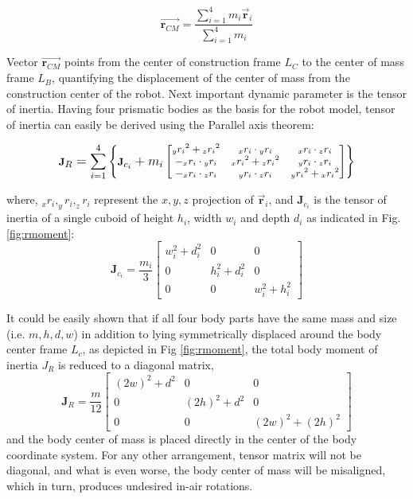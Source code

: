 \begin{equation}\label{eq:CMrobot}
\vec{\textbf{r}_{CM}}=\frac{\sum_{i=1}^{4}m_i\vec{\textbf{r}}_i}{\sum_{i=1}^{4}m_i}
\end{equation}

Vector $\vec{\textbf{r}_{CM}}$ points from the center of construction frame $L_C$ to the center of mass frame $L_B$, quantifying the displacement of the center of mass from the construction center of the robot. Next important dynamic parameter is the tensor of inertia. Having four prismatic bodies as the basis for the robot model, tensor of inertia can easily be derived using the Parallel axis theorem:

\begin{equation}
\footnotesize
\textbf{J}_R=\sum_{i=1}^{4}\left \{\textbf{J}_{c_i}+m_i\begin{bmatrix}
{_yr_i}^2+{_zr_i}^2 & {_xr_i}\cdot {_yr_i} & {_xr_i}\cdot {_zr_i} \\ 
-{_xr_i}\cdot {_yr_i} & {_xr_i}^2+{_zr_i}^2 & {_yr_i}\cdot {_zr_i}\\ 
-{_xr_i}\cdot {_zr_i} & {_yr_i}\cdot {_zr_i} & {_yr_i}^2+{_xr_i}^2
\end{bmatrix} \right \}
\normalsize
\end{equation}

where, $_xr_i, _yr_i, _zr_i$ represent the $x,y,z$ projection of $\vec{\textbf{r}}_i$, and $\textbf{J}_{c_i}$ is the tensor of inertia of a single cuboid of height $h_i$, width $w_i$ and depth $d_i$ as indicated in Fig. \ref{fig:rmoment}:
\begin{equation}
\textbf{J}_{c_i}=\frac{m_i}{3}\begin{bmatrix}
w_i^2+d_i^2 &0&0 \\ 
0 &h_i^2+d_i^2&0\\ 
0 &0& w_i^2+h_i^2
\end{bmatrix}
\end{equation} 

It could be easily shown that if all four body parts have the same mass and size (i.e. $m,h,d,w$) in addition to lying symmetrically displaced around the body center frame $L_c$, as depicted in Fig \ref{fig:rmoment}, the total body moment of inertia $J_R$ is reduced to a diagonal matrix,
\begin{equation}
\textbf{J}_{R}=\frac{m}{12}\begin{bmatrix}
(2w)^2+d^2 &0&0 \\ 
0 &(2h)^2+d^2&0\\ 
0 &0& (2w)^2+(2h)^2
\end{bmatrix}
\end{equation} 
and the body center of mass is placed directly in the center of the body coordinate system. For any other arrangement, tensor matrix will not be diagonal, and what is even worse, the body center of mass will be misaligned, which in turn, produces undesired in-air rotations.

